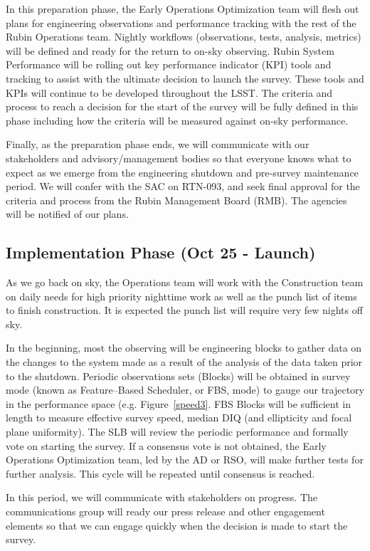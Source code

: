 In this preparation phase, the Early Operations Optimization team will flesh out plans for engineering observations and performance tracking with the rest of the Rubin Operations team. Nightly workflows (observations, tests, analysis, metrics) will be defined and ready for the return to on-sky observing. Rubin System Performance will be rolling out key performance indicator (KPI) tools and tracking to assist with the ultimate decision to launch the survey. These tools and KPIs will continue to be developed throughout the LSST. The criteria and process to reach a decision for the start of the survey will be fully defined in this phase including how the criteria will be measured against on-sky performance. 

Finally, as the preparation phase ends, we will communicate with our stakeholders and advisory/management bodies so that everyone knows what to expect as we emerge from the engineering shutdown and pre-survey maintenance period. We will confer with the SAC on RTN-093, and seek final approval for the criteria and process from the Rubin Management Board (RMB). The agencies will be notified of our plans. 

\subsection {Implementation Phase (Oct 25 - Launch)}

As we go back on sky, the Operations team will work with the Construction team on daily needs for high priority nighttime work as well as the punch list of items to finish construction. It is expected the punch list will require very few nights off sky. 

In the beginning, most the observing will be engineering blocks to gather data on the changes to the system made as a result of the analysis of the data taken prior to the shutdown. Periodic observations sets (Blocks) will be obtained in survey mode (known as Feature--Based Scheduler, or FBS, mode) to gauge our trajectory in the performance space (e.g. Figure~\ref{speed3}. FBS Blocks will be sufficient in length to measure effective survey speed, median DIQ (and ellipticity and focal plane uniformity). The SLB will review the periodic performance and formally vote on starting the survey. If a consensus vote is not obtained, the Early Operations Optimization team, led by the AD or RSO, will make further tests for further analysis. This cycle will be repeated until consensus is reached. 

In this period, we will communicate with stakeholders on progress. The communications group will ready our press release and other engagement elements so that we can engage quickly when the decision is made to start the survey. 

